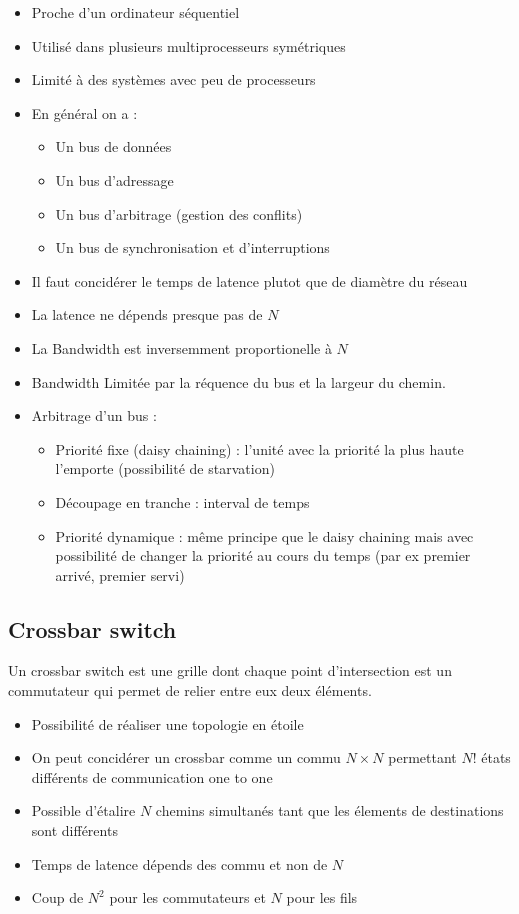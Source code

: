\documentclass[12pt,a4paper,oneside, titlepage]{article}
\begin{document}
      \begin{itemize}
        \item Proche d'un ordinateur séquentiel
        \item Utilisé dans plusieurs multiprocesseurs symétriques
        \item Limité à des systèmes avec peu de processeurs
        \item En général on a :
        \begin{itemize}
          \item Un bus de données
          \item Un bus d'adressage
          \item Un bus d'arbitrage (gestion des conflits)
          \item Un bus de synchronisation et d'interruptions
        \end{itemize}
        \item Il faut concidérer le temps de latence plutot que de diamètre du réseau
        \item La latence ne dépends presque pas de $N$
        \item La Bandwidth est inversemment proportionelle à $N$
        \item Bandwidth Limitée par la réquence du bus et la largeur du chemin.
        \item Arbitrage d’un bus :
        \begin{itemize}
          \item Priorité fixe (daisy chaining) : l'unité avec la priorité la plus haute l'emporte (possibilité de starvation)
          \item Découpage en tranche : interval de temps
          \item Priorité dynamique : même principe que le daisy chaining mais avec possibilité de changer la priorité au cours du temps (par ex premier arrivé, premier servi)
        \end{itemize}
      \end{itemize}

    \subsection*{Crossbar switch}

      Un crossbar switch est une grille dont chaque point d’intersection est un commutateur qui permet de relier entre eux deux éléments.

      \begin{itemize}
        \item Possibilité de réaliser une topologie en étoile
        \item On peut concidérer un crossbar comme un commu $N \times N$ permettant $N!$ états différents de communication one to one
        \item Possible d'étalire $N$ chemins simultanés tant que les élements de destinations sont différents
        \item Temps de latence dépends des commu et non de $N$
        \item Coup de $N^2$ pour les commutateurs et $N$ pour les fils
      \end{itemize}
\end{document}
